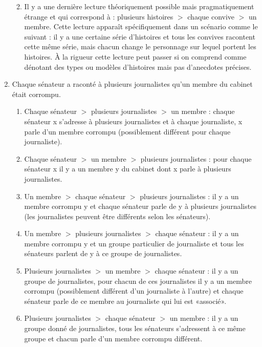 \begin{exo}
\begin{solu}
\begin{enumerate}
\begin{enumerate}
\sloppy
\item Il y a une dernière lecture théoriquement possible mais pragmatiquement étrange et qui correspond à : plusieurs histoires $>$ chaque convive $>$ un membre.  Cette lecture apparaît spécifiquement dans un scénario comme le suivant : il y a une certaine série d'histoires et tous les convives racontent cette même série, mais chacun change le personnage sur lequel portent les histoires. 
  À la rigueur cette lecture peut passer si on comprend  comme dénotant des types ou modèles d'histoires mais pas d'anecdotes précises.

\fussy
\end{enumerate}

\item
Chaque sénateur a raconté à plusieurs journalistes qu'un membre du
cabinet était corrompu.

\begin{enumerate}
\item Chaque sénateur $>$ plusieurs journalistes $>$ un membre :
chaque sénateur \Obj x s'adresse à plusieurs journalistes et à chaque journaliste, \Obj x parle d'un membre corrompu (possiblement différent pour chaque journaliste).

\item Chaque sénateur $>$ un membre $>$ plusieurs journalistes :
pour chaque sénateur \Obj x il y a un membre \Obj y du cabinet dont \Obj x parle à plusieurs journalistes.

\item  Un membre $>$ chaque sénateur $>$ plusieurs journalistes : 
il y a un membre corrompu \Obj y et chaque sénateur parle de \Obj y à plusieurs journalistes (les journalistes peuvent être différents selon les sénateurs).

\item  Un membre $>$ plusieurs journalistes $>$ chaque sénateur :
il y a un membre corrompu \Obj y et un groupe particulier de journaliste et tous les sénateurs parlent de \Obj y à ce groupe de journalistes.

\item  Plusieurs journalistes $>$ un membre $>$ chaque sénateur :
il y a un groupe de journalistes, pour chacun de ces journalistes il y a un membre corrompu (possiblement différent d'un journaliste à l'autre) et chaque sénateur parle de ce membre au journaliste qui lui est «associé».

\item  Plusieurs journalistes $>$ chaque sénateur $>$ un membre :
il y a un groupe donné de journalistes, tous les sénateurs s'adressent à ce même groupe et chacun parle d'un membre corrompu différent.


\end{enumerate}
\end{enumerate}
\end{solu}
\end{exo}
